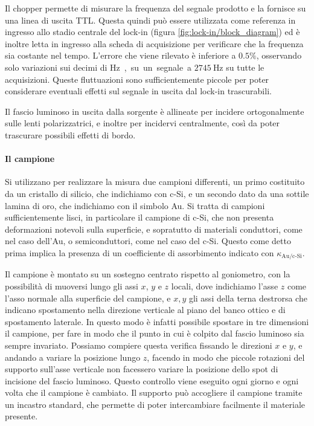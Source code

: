 \documentclass[prb,showpacs,floatfix,altaffilletter,amsmath,amssymb,reprint,citeautoscript,showkeys]{revtex4-1}
\begin{document}
Il chopper permette di misurare la frequenza del segnale prodotto e la fornisce su una linea di uscita TTL. Questa quindi può essere utilizzata come referenza in ingresso allo stadio centrale del lock-in (figura \ref{fig:lock-in/block_diagram}) ed è inoltre letta in ingresso alla scheda di acquisizione per verificare che la frequenza sia costante nel tempo. L'errore che viene rilevato è inferiore a $0.5\%$, osservando solo variazioni sui decimi di \si\hertz, su un segnale a $\SI{2745}\hertz$ su tutte le acquisizioni. Queste fluttuazioni sono sufficientemente piccole per poter considerare eventuali effetti sul segnale in uscita dal lock-in trascurabili. 

Il fascio luminoso in uscita dalla sorgente è allineate per incidere ortogonalmente sulle lenti polarizzatrici, e inoltre per incidervi centralmente, così da poter trascurare possibili effetti di bordo. 

\paragraph*{Il campione} Si utilizzano per realizzare la misura due campioni differenti, un primo costituito da un cristallo di silicio, che indichiamo con c-Si, e un secondo dato da una sottile lamina di oro, che indichiamo con il simbolo Au. Si tratta di campioni sufficientemente lisci, in particolare il campione di c-Si, che non presenta deformazioni notevoli sulla superficie, e sopratutto di materiali conduttori, come nel caso dell'Au, o semiconduttori, come nel caso del c-Si. Questo come detto prima implica la presenza di un coefficiente di assorbimento indicato con $\kappa_\text{Au/c-Si}$. 

Il campione è montato su un sostegno centrato rispetto al goniometro, con la possibilità di muoversi lungo gli assi $x$, $y$ e $z$ locali, dove indichiamo l'asse $z$ come l'asso normale alla superficie del campione, e $x, y$ gli assi della terna destrorsa che indicano spostamento nella direzione verticale al piano del banco ottico e di spostamento laterale. In questo modo è infatti possibile spostare in tre dimensioni il campione, per fare in modo che il punto in cui è colpito dal fascio luminoso sia sempre invariato. Possiamo compiere questa verifica fissando le direzioni $x$ e $y$, e andando a variare la posizione lungo $z$, facendo in modo che piccole rotazioni del supporto sull'asse verticale non facessero variare la posizione dello spot di incisione del fascio luminoso. Questo controllo viene eseguito ogni giorno e ogni volta che il campione è cambiato. Il supporto può accogliere il campione tramite un incastro standard, che permette di poter intercambiare facilmente il materiale presente. 
\end{document}
